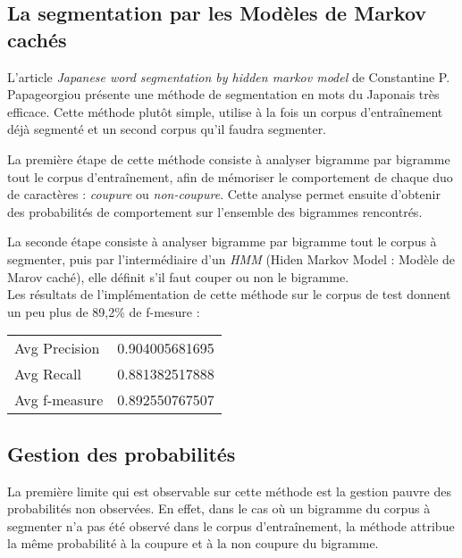
\subsection{La segmentation par les Modèles de Markov cachés}

L'article \textit{Japanese word segmentation by hidden markov model} de Constantine P. Papageorgiou\cite{Papageorgiou:001} présente une méthode de segmentation en mots du Japonais très efficace. Cette méthode plutôt simple, utilise à la fois un corpus d'entraînement déjà segmenté et un second corpus qu'il faudra segmenter. 

La première étape de cette méthode consiste à analyser bigramme par bigramme tout le corpus d'entraînement, afin de mémoriser le comportement de chaque duo de caractères : \textit{coupure} ou \textit{non-coupure}. Cette analyse permet ensuite d'obtenir des probabilités de comportement sur l'ensemble des bigrammes rencontrés.

La seconde étape consiste à analyser bigramme par bigramme tout le corpus à segmenter, puis par l'intermédiaire d'un \textit{HMM} (Hiden Markov Model : Modèle de Marov caché), elle définit s'il faut couper ou non le bigramme.\\

Les résultats de l'implémentation de cette méthode sur le corpus de test donnent un peu plus de 89,2\% de f-mesure :
\begin{center}
	\begin{tabular}{|l c|}
	  	\hline
	  	Avg Precision & 0.904005681695 \\
		Avg Recall & 0.881382517888 \\
		Avg f-measure & 0.892550767507 \\
	  	\hline
	\end{tabular}
\end{center}


\subsection{Gestion des probabilités}

La première limite qui est observable sur cette méthode est la gestion pauvre des probabilités non observées. En effet, dans le cas où un bigramme du corpus à segmenter n'a pas été observé dans le corpus d'entraînement, la méthode attribue la même probabilité à la coupure et à la non coupure du bigramme. \\

